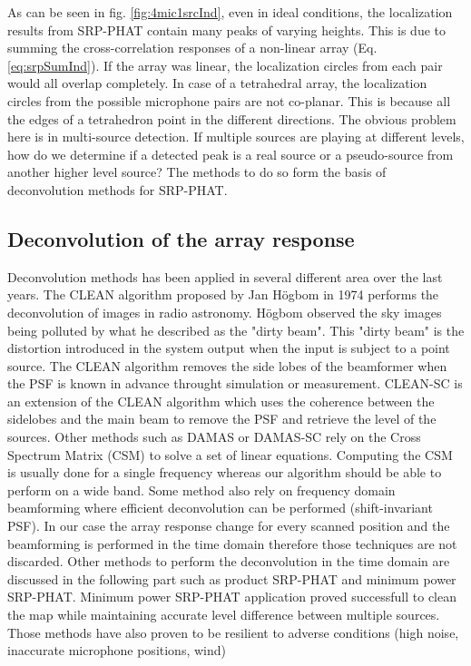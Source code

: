 \newpage

As can be seen in fig. \ref{fig:4mic1srcInd}, even in ideal conditions, the localization results from SRP-PHAT contain many peaks of varying heights. This is due to summing the cross-correlation responses of a non-linear array (Eq. \ref{eq:srpSumInd}). If the array was linear, the localization circles from each pair would all overlap completely. In case of a tetrahedral array, the localization circles from the possible microphone pairs are not co-planar. This is because all the edges of a tetrahedron point in the different directions. The obvious problem here is in multi-source detection. If multiple sources are playing at different levels, how do we determine if a detected peak is a real source or a pseudo-source from another higher level source? The methods to do so form the basis of deconvolution methods for SRP-PHAT.

\subsection{Deconvolution of the array response}

Deconvolution methods has been applied in several different area over the last years. The CLEAN algorithm proposed by Jan Högbom in 1974 \cite{1974A&AS...15..417H} performs the deconvolution of images in radio astronomy. Högbom observed the sky images being polluted by what he described as the "dirty beam". This "dirty beam" is the distortion introduced in the system output when the input is subject to a point source. The CLEAN algorithm removes the side lobes of the beamformer when the PSF is known in advance throught simulation or measurement. CLEAN-SC is an extension of the CLEAN algorithm which uses the coherence between the sidelobes and the main beam to remove the PSF and retrieve the level of the sources. Other methods such as DAMAS or DAMAS-SC rely on the Cross Spectrum Matrix (CSM) to solve a set of linear equations. Computing the CSM is usually done for a single frequency whereas our algorithm should be able to perform on a wide band. Some method also rely on frequency domain beamforming where efficient deconvolution can be performed (shift-invariant PSF). In our case the array response change for every scanned position and the beamforming is performed in the time domain therefore those techniques are not discarded. Other methods to perform the deconvolution in the time domain are discussed in the following part such as product SRP-PHAT and minimum power SRP-PHAT. Minimum power SRP-PHAT application proved successfull to clean the map while maintaining accurate level difference between multiple sources. Those methods have also proven to be resilient to adverse conditions (high noise, inaccurate microphone positions, wind)

